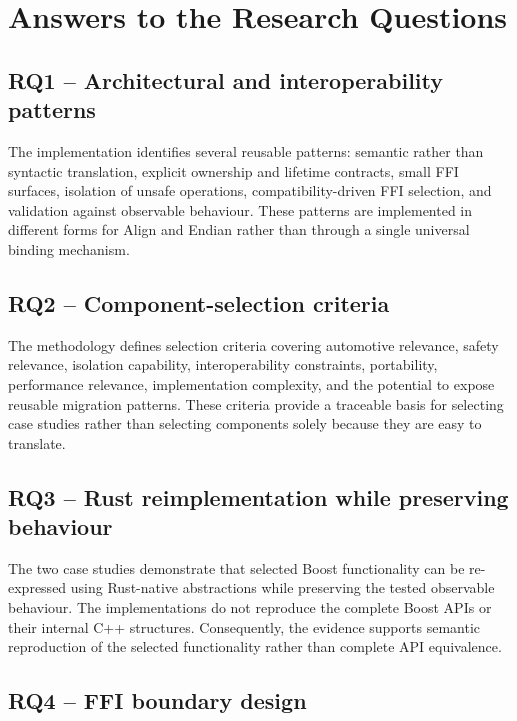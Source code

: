 \section{Answers to the Research Questions}
\label{sec:answers_research_questions}

\subsection{RQ1 -- Architectural and interoperability patterns}

The implementation identifies several reusable patterns: semantic rather than syntactic translation, explicit ownership and lifetime contracts, small FFI surfaces, isolation of unsafe operations, compatibility-driven FFI selection, and validation against observable behaviour. These patterns are implemented in different forms for Align and Endian rather than through a single universal binding mechanism.

\subsection{RQ2 -- Component-selection criteria}

The methodology defines selection criteria covering automotive relevance, safety relevance, isolation capability, interoperability constraints, portability, performance relevance, implementation complexity, and the potential to expose reusable migration patterns. These criteria provide a traceable basis for selecting case studies rather than selecting components solely because they are easy to translate.

\subsection{RQ3 -- Rust reimplementation while preserving behaviour}

The two case studies demonstrate that selected Boost functionality can be re-expressed using Rust-native abstractions while preserving the tested observable behaviour. The implementations do not reproduce the complete Boost APIs or their internal C++ structures. Consequently, the evidence supports semantic reproduction of the selected functionality rather than complete API equivalence.

\subsection{RQ4 -- FFI boundary design}

